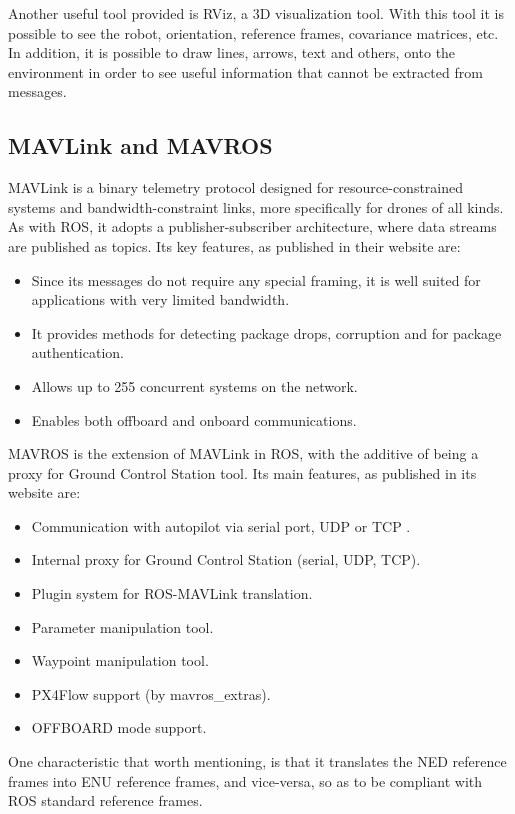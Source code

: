 Another useful tool provided is \ac{RViz}, a 3D visualization tool. With this tool it is possible to see the robot, orientation, reference frames, covariance matrices, etc. In addition, it is possible to draw lines, arrows, text and others, onto the environment in order to see useful information that cannot be extracted from messages.

\subsection{MAVLink and MAVROS}
\label{sssec:chapter2:drone:mavlink}
MAVLink is a binary telemetry protocol designed for resource-constrained systems and bandwidth-constraint links, more specifically for drones of all kinds. As with ROS, it adopts a publisher-subscriber architecture, where data streams are published as topics. Its key features, as published in their website are:
\begin{itemize}
    \item Since its messages do not require any special framing, it is well suited for applications with very limited bandwidth.
    \item It provides methods for detecting package drops, corruption and for package authentication.
    \item Allows up to 255 concurrent systems on the network.
    \item Enables both offboard and onboard communications.
\end{itemize}
MAVROS is the extension of MAVLink in ROS, with the additive of being a proxy for Ground Control Station tool. Its main features, as published in its website are:
\begin{itemize}
    \item Communication with autopilot via serial port, UDP or TCP .
    \item Internal proxy for Ground Control Station (serial, UDP, TCP).
    \item Plugin system for ROS-MAVLink translation.
    \item Parameter manipulation tool.
    \item Waypoint manipulation tool.
    \item PX4Flow support (by mavros\_extras).
    \item OFFBOARD mode support.
\end{itemize}

One characteristic that worth mentioning, is that it translates the \ac{NED} reference frames into \ac{ENU} reference frames, and vice-versa, so as to be compliant with ROS standard reference frames.

